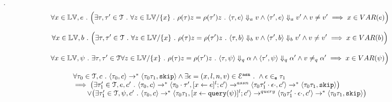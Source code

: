 \begin{lem}.
\label{lem:inv_a}
\[
	\forall x \in \mathbb{LV}, e ~.~ 
	\Big( \exists \mathtt{\tau}, \mathtt{\tau}' \in \mathcal{T} ~.~ \forall z \in \mathbb{LV} / \{x\} ~.~ 
	\rho(\mathtt{\tau}) z = \rho(\mathtt{\tau}') z ~.~ 
	\langle \mathtt{\tau}, e \rangle \Downarrow_a v \land \langle \mathtt{\tau}', e \rangle \Downarrow_a v' \land v \neq v'
	\implies x \in VAR(e)\Big)
\]
\end{lem}
%
%
\begin{lem}
\label{lem:inv_b}
\[
	\forall x \in \mathbb{LV}, b ~.~ 
	\Big( \exists \mathtt{\tau}, \mathtt{\tau}' \in \mathcal{T} ~.~ \forall z \in \mathbb{LV} / \{x\} ~.~
	\rho(\mathtt{\tau}) z = \rho(\mathtt{\tau}') z ~.~ 
	\langle \mathtt{\tau}, b \rangle \Downarrow_b v \land \langle \mathtt{\tau}', b \rangle \Downarrow_b v' \land v \neq v'
	\implies x \in VAR(b) \Big)
\]
\end{lem}
%
\begin{lem}
\label{lem:inv_q}
\[
	\forall x \in \mathbb{LV}, \psi ~.~ \exists \mathtt{\tau}, \mathtt{\tau}' \in \mathcal{T} \forall z \in \mathbb{LV} / \{x\} ~.~
	\rho(\mathtt{\tau}) z = \rho(\mathtt{\tau}') z ~.~ 
	\langle \mathtt{\tau}, \psi \rangle \Downarrow_q \alpha \land \langle \mathtt{\tau}', \psi \rangle \Downarrow_q \alpha' 
	\land v \neq_{q} \alpha'
	\implies x \in VAR(\psi) \Big)
\]
\end{lem}
%
%
\begin{lem}
\label{lem:inv_asn}
\[
\begin{array}{l}
	\forall \mathtt{\tau}_0 \in \mathcal{T}, c ~.~ \langle \mathtt{\tau}_0, c \rangle \rightarrow^* \langle \mathtt{\tau}_0\mathtt{\tau}_1, \mathtt{skip} \rangle
	\land \exists \mathtt{\epsilon} = (x, l, n, v) \in \mathcal{E}^{\mathtt{{asn}}} ~.~
	\land \mathtt{\epsilon} \in_{\mathtt{e}} \mathtt{\tau}_1 \\
	\implies 
	\big( 
		\exists \mathtt{\tau}_1' \in \mathcal{T}, e, c' ~.~
		\langle \mathtt{\tau}_0, c \rangle \rightarrow^* \langle \mathtt{\tau}_0 \cdot \mathtt{\tau}', [\mathrel{ x \leftarrow e }]^l;c' \rangle \rightarrow^{assn}
		\langle \mathtt{\tau}_0\mathtt{\tau}_1'\cdot \mathtt{\epsilon} \cdot, c' \rangle \rightarrow^{*}
		\langle \mathtt{\tau}_0\mathtt{\tau}_1, \mathtt{skip} \rangle
	\big)
	\\ \qquad \lor
	\big( 
		\exists \mathtt{\tau}_1' \in \mathcal{T}, \psi, c' ~.~
		\langle \mathtt{\tau}_0, c \rangle \rightarrow^* \langle \mathtt{\tau}_0\mathtt{\tau}_1, [\mathrel{ x \leftarrow {\tt query}(\psi) }]^l;c' \rangle \rightarrow^{query}
		\langle \mathtt{\tau}_0\mathtt{\tau}_1' \cdot \mathtt{\epsilon} \cdot, c' \rangle \rightarrow^{*}
		\langle \mathtt{\tau}_0\mathtt{\tau}_1, \mathtt{skip} \rangle
	\big)
\end{array}
\]
%
\end{lem}
